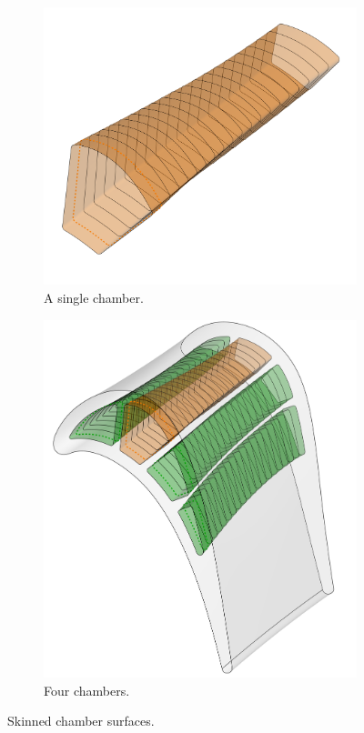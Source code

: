 \documentclass[a4paper, 11pt]{report}
\theoremstyle{definition}
\begin{document}
	\begin{figure}[H]
		\centering
		\begin{subfigure}{.54\textwidth}
			\includegraphics[width=\textwidth]{../tec/chambers/114.png}
			\caption{A single chamber.}
		\end{subfigure}
		\begin{subfigure}{.44\textwidth}
			\includegraphics[width=\textwidth]{../tec/chambers/111.png}
			\caption{Four chambers.}
		\end{subfigure}
		\caption{Skinned chamber surfaces.}
		\label{fig:skinned_chambers}
	\end{figure}
	
\end{document}
